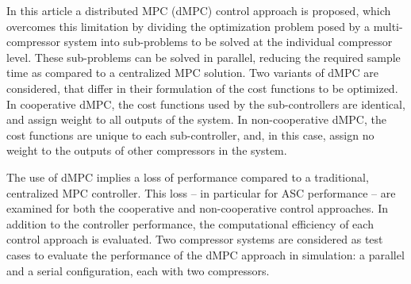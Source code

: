 In this article a distributed MPC (dMPC) control approach is proposed, which overcomes this limitation by dividing the optimization problem posed by a multi-compressor system into sub-problems to be solved at the individual compressor level.
These sub-problems can be solved in parallel, reducing the required sample time as compared to a centralized MPC solution.
Two variants of dMPC are considered, that differ in their formulation of the cost functions to be optimized.
In cooperative dMPC, the cost functions used by the sub-controllers are identical, and assign weight to all outputs of the system.
In non-cooperative dMPC, the cost functions are unique to each sub-controller, and, in this case, assign no weight to the outputs of other compressors in the system.

The use of dMPC implies a loss of performance compared to a traditional, centralized MPC controller.
This loss -- in particular for ASC performance -- are examined for both the cooperative and non-cooperative control approaches.
In addition to the controller performance, the computational efficiency of each control approach is evaluated.
Two compressor systems are considered as test cases to evaluate the performance of the dMPC approach in simulation: a parallel and a serial configuration, each with two compressors.
